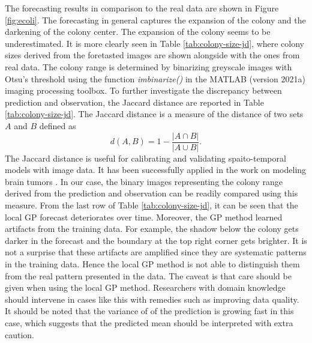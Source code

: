 \documentclass[smallextended,natbib]{svjour3}       %
\begin{document}
The forecasting results in comparison to the real data are shown in Figure \ref{fig:ecoli}. The forecasting in general captures the expansion of the colony and the darkening of the colony center. The expansion of the colony seems to be underestimated. It is more clearly seen in Table \ref{tab:colony-size-jd}, where colony sizes derived from the foretasted images are shown alongside with the ones from real data. The colony range is determined by binarizing greyscale images with Otsu's threshold \citep{otsu1979threshold} using the function \textit{imbinarize()} in the MATLAB (version 2021a) imaging processing toolbox. To further investigate the discrepancy between prediction and observation, the Jaccard distance are reported in Table \ref{tab:colony-size-jd}. The Jaccard distance is a measure of the distance of two sets $A$ and $B$ defined as \[d(A,B)=1-\frac{\vert A \cap B \vert}{\vert A \cup B \vert}.\] The Jaccard distance is useful for calibrating and validating spaito-temporal models with image data. It has been successfully applied in the work on modeling brain tumors \citep{rutter2017mathematical}. In our case, the binary images representing the colony range derived from the prediction and observation can be readily compared using this measure. From the last row of Table \ref{tab:colony-size-jd}, it can be seen that the local GP forecast deteriorates over time. Moreover, the GP method learned artifacts from the training data. For example, the shadow below the colony gets darker in the forecast and the boundary at the top right corner gets brighter. It is not a surprise that these artifacts are amplified since they are systematic patterns in the training data. Hence the local GP method is not able to distinguish them from the real pattern presented in the data. The caveat is that care should be given when using the local GP method. Researchers with domain knowledge should intervene in cases like this with remedies such as improving data quality. It should be noted that the variance of of the prediction is growing fast in this case, which suggests that the predicted mean should be interpreted with extra caution.          
\end{document}
